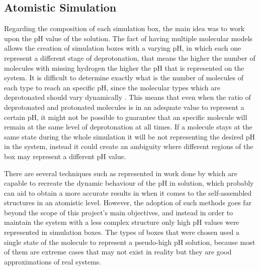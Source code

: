 \documentclass[10pt,a4paper,twoside]{article}
\begin{document}
\subsection{Atomistic Simulation}

Regarding the composition of each simulation box, the main idea was to work upon the pH value of the solution. The fact of having multiple molecular models allows the creation of simulation boxes with a varying pH, in which each one represent a different stage of deprotonation, that means the higher the number of molecules with missing hydrogen the higher the pH that is represented on the system. It is difficult to determine exactly what is the number of molecules of each type to reach an specific pH, since the molecular types which are deprotonated should vary dynamically \cite{phsol}. This means that even when the ratio of deprotonated and protonated molecules is in an adequate value to represent a certain pH, it might not be possible to guarantee that an specific molecule will remain at the same level of deprotonation  at all times. If a molecule stays at the same state during the whole simulation it will be not representing the desired pH in the system, instead it could create an ambiguity where different regions of the box may represent a different pH value.

 There are several techniques such as represented in work done by \cite{dynph} which are capable to recreate the dynamic behaviour of the pH in solution, which probably can aid to obtain a more accurate results in when it comes to the self-assembled structures in an atomistic level. However, the adoption of such methods goes far beyond the scope of this project's main objectives, and instead in order to maintain the system with a less complex structure only high pH values were represented in simulation boxes. The types of boxes that were chosen used a single state of the molecule to represent a pseudo-high pH solution, because most of them are extreme cases that may not exist in reality but they are good approximations of real systems.
\end{document}
